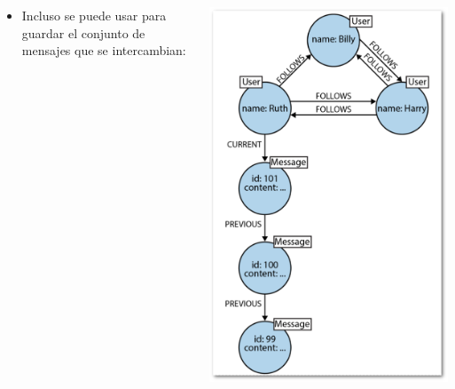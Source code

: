\documentclass[14pt]{beamer}
\begin{document}
\begin{frame}[allowframebreaks]
\begin{columns}
\begin{column}{.5\textwidth}
\begin{itemize}
      \item Incluso se puede usar para guardar el conjunto de mensajes
        que se intercambian:
      \end{itemize}
    \end{column}
      \begin{column}{.5\textwidth}
        \begin{center}
          \includegraphics[width=.8\textwidth]{img/graph2}
        \end{center}
      \end{column}
    \end{columns}

\end{frame}
\end{document}
